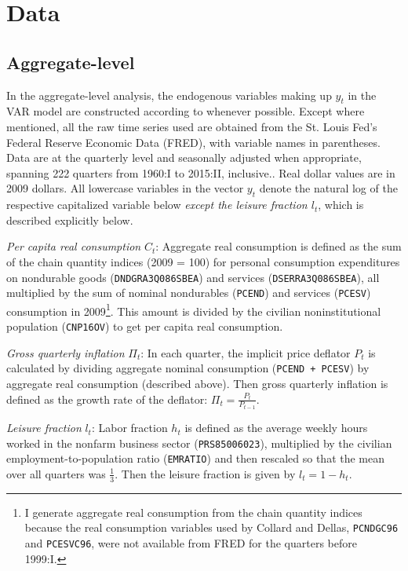 \section{Data}

\subsection{Aggregate-level}
\label{aggregate-data}

In the aggregate-level analysis, the endogenous variables making up $y_t$ in the VAR model are constructed according to \cite{collard11} whenever possible. Except where mentioned, all the raw time series used are obtained from the St. Louis Fed's Federal Reserve Economic Data (FRED), with variable names in parentheses. Data are at the quarterly level and seasonally adjusted when appropriate, spanning 222 quarters from 1960:I to 2015:II, inclusive.. Real dollar values are in 2009 dollars. All lowercase variables in the vector $y_t$ denote the natural log of the respective capitalized variable below \textit{except the leisure fraction $l_t$}, which is described explicitly below.

\textit{Per capita real consumption} $C_t$: Aggregate real consumption is defined as the sum of the chain quantity indices (2009 = 100) for personal consumption expenditures on nondurable goods (\texttt{DNDGRA3Q086SBEA}) and services (\texttt{DSERRA3Q086SBEA}), all multiplied by the sum of nominal nondurables (\texttt{PCEND}) and services (\texttt{PCESV}) consumption in 2009\footnote{I generate aggregate real consumption from the chain quantity indices because the real consumption variables used by Collard and Dellas, \texttt{PCNDGC96} and \texttt{PCESVC96}, were not available from FRED for the quarters before 1999:I.}. This amount is divided by the civilian noninstitutional population (\texttt{CNP16OV}) to get per capita real consumption.

\textit{Gross quarterly inflation} $\Pi_t$: In each quarter, the implicit price deflator $P_t$ is calculated by dividing aggregate nominal consumption (\texttt{PCEND + PCESV}) by aggregate real consumption (described above). Then gross quarterly inflation is defined as the growth rate of the deflator: $\Pi_t = \frac{P_t}{P_{t-1}}$.

\textit{Leisure fraction} $l_t$: Labor fraction $h_t$ is defined as the average weekly hours worked in the nonfarm business sector (\texttt{PRS85006023}), multiplied by the civilian employment-to-population ratio (\texttt{EMRATIO}) and then rescaled so that the mean over all quarters was $\frac{1}{3}$. Then the leisure fraction is given by $l_t = 1 - h_t$.


